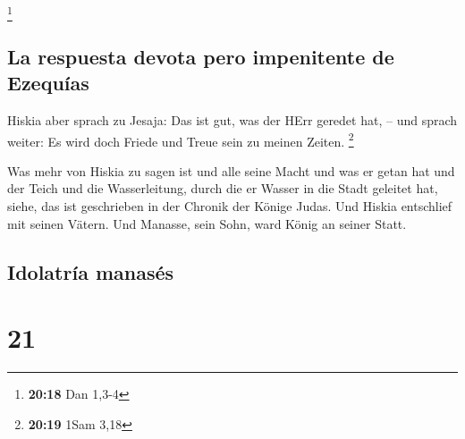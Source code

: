 \footnote{\textbf{20:18} Dan 1,3-4}

\hypertarget{la-respuesta-devota-pero-impenitente-de-ezequuxedas}{%
\subsection{La respuesta devota pero impenitente de
Ezequías}\label{la-respuesta-devota-pero-impenitente-de-ezequuxedas}}

 Hiskia aber sprach zu Jesaja: Das ist gut, was der HErr
geredet hat, -- und sprach weiter: Es wird doch Friede und Treue sein zu
meinen Zeiten. \footnote{\textbf{20:19} 1Sam 3,18}

 Was mehr von Hiskia zu sagen ist und alle seine Macht
und was er getan hat und der Teich und die Wasserleitung, durch die er
Wasser in die Stadt geleitet hat, siehe, das ist geschrieben in der
Chronik der Könige Judas.  Und Hiskia entschlief mit
seinen Vätern. Und Manasse, sein Sohn, ward König an seiner Statt.

\hypertarget{idolatruxeda-manasuxe9s}{%
\subsection{Idolatría manasés}\label{idolatruxeda-manasuxe9s}}

\hypertarget{section-20}{%
\section{21}\label{section-20}}

